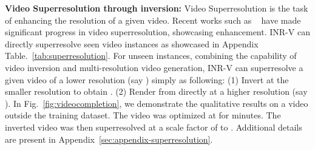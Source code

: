 \documentclass[10pt]{article} \usepackage[accepted]{tmlr}
\begin{document}
\textbf{Video Superresolution through inversion:} Video Superresolution is the task of enhancing the resolution of a given video.
Recent works such as ~\cite{tecogan, vrt, framerecvideosr, iseebetter, edvr, videoinr} have made significant progress in video superresolution, showcasing  enhancement. INR-V can directly superresolve seen video instances as showcased in Appendix Table.~\ref{tab:superresolution}. For unseen instances, combining the capability of video inversion and multi-resolution video generation, INR-V can superresolve a given video  of a lower resolution (say ) simply as following: (1) Invert  at the smaller resolution to obtain . (2) Render  from  directly at a higher resolution (say ). In Fig.~\ref{fig:videocompletion}, we demonstrate the qualitative results on a video outside the training dataset. The video was optimized at  for  minutes.
The inverted video was then superresolved at a scale factor of  to . Additional details are present in Appendix~\ref{sec:appendix-superresolution}.
\end{document}
